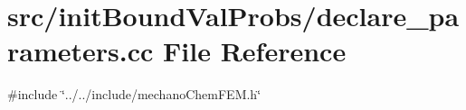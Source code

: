\section{src/init\+Bound\+Val\+Probs/declare\+\_\+parameters.cc File Reference}
\label{init_bound_val_probs_2declare__parameters_8cc}
{\ttfamily \#include \char`\"{}../../include/mechano\+Chem\+F\+E\+M.\+h\char`\"{}}\newline
